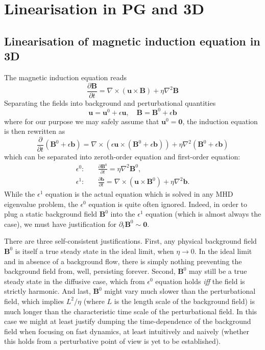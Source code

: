 \section{Linearisation in PG and 3D}

\subsection{Linearisation of magnetic induction equation in 3D}

The magnetic induction equation reads
\begin{equation}\label{eqn:induction-total}
    \frac{\partial \mathbf{B}}{\partial t} = \nabla\times (\mathbf{u}\times \mathbf{B}) + \eta \nabla^2 \mathbf{B}
\end{equation}
Separating the fields into background and perturbational quantities
\[
    \mathbf{u} = \mathbf{u}^0 + \epsilon \mathbf{u},\quad 
    \mathbf{B} = \mathbf{B}^0 + \epsilon \mathbf{b}
\]
where for our purpose we may safely assume that $\mathbf{u}^0 = \mathbf{0}$, the induction equation is then rewritten as
\[
    \frac{\partial}{\partial t} \left(\mathbf{B}^0 + \epsilon \mathbf{b}\right) = \nabla\times \left(\epsilon \mathbf{u}\times (\mathbf{B}^0 + \epsilon \mathbf{b})\right) + \eta \nabla^2 (\mathbf{B}^0 + \epsilon \mathbf{b})
\]
which can be separated into zeroth-order equation and first-order equation:
\begin{equation}\label{eqn:induction-orders-0-1}
\begin{aligned}
    \epsilon^0: \quad &\frac{\partial \mathbf{B}^0}{\partial t} = \eta \nabla^2 \mathbf{B}^0, \\ 
    \epsilon^1: \quad &\frac{\partial \mathbf{b}}{\partial t} = \nabla\times (\mathbf{u}\times \mathbf{B}^0) + \eta \nabla^2 \mathbf{b}.
\end{aligned}
\end{equation}
While the $\epsilon^1$ equation is the actual equation which is solved in any MHD eigenvalue problem, the $\epsilon^0$ equation is quite often ignored. 
Indeed, in order to plug a static background field $\mathbf{B}^0$ into the $\epsilon^1$ equation (which is almost always the case), we must have justification for $\partial_t \mathbf{B}^0 \sim \mathbf{0}$. 

There are three self-consistent justifications.
First, any physical background field $\mathbf{B}^0$ is itself a true steady state in the ideal limit, when $\eta \rightarrow 0$. In the ideal limit and in absence of a background flow, there is simply nothing preventing the background field from, well, persisting forever.
Second, $\mathbf{B}^0$ may still be a true steady state in the diffusive case, which from $\epsilon^0$ equation holds \textit{iff} the field is strictly harmonic.
And last, $\mathbf{B}^0$ might vary much slower than the perturbational field, which implies $L^2/\eta$ (where $L$ is the length scale of the background field) is much longer than the characteristic time scale of the perturbational field. In this case we might at least justify dumping the time-dependence of the background field when focusing on fast dynamics, at least intuitively and naively (whether this holds from a perturbative point of view is yet to be established).

